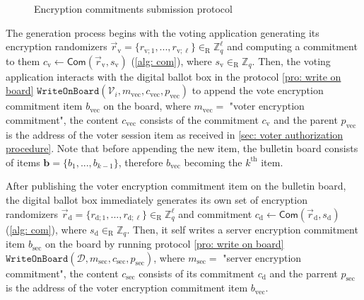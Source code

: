 \begin{figure}[ht]
    \caption{Encryption commitments submission protocol}
    \label{fig: encryption commitments submission protocol}
\end{figure}

The generation process begins with the voting application generating its encryption randomizers $\vec{r}_\mathrm{v} = \{ r_{\mathrm{v}; 1}, ..., r_{\mathrm{v}; \ell} \} \in_\mathrm{R} \mathbb{Z}^\ell_q$ and computing a commitment to them $c_\mathrm{v} \gets \mathsf{Com}(\vec{r}_\mathrm{v}, s_\mathrm{v})$ (\cref{alg: com}), where $s_\mathrm{v} \in_\mathrm{R} \mathbb{Z}_q$. Then, the voting application interacts with the digital ballot box in the protocol \ref{pro: write on board} $\mathtt{WriteOnBoard}(\mathcal{V}_i, m_\mathrm{vec}, c_\mathrm{vec}, p_\mathrm{vec})$ to append the vote encryption commitment item $b_\mathrm{vec}$ on the board, where $m_\mathrm{vec} =$ "voter encryption commitment", the content $c_\mathrm{vec}$ consists of the commitment $c_\mathrm{v}$ and the parent $p_\mathrm{vec}$ is the address of the voter session item as received in \cref{sec: voter authorization procedure}. Note that before appending the new item, the bulletin board consists of items $\boldsymbol{b} = \{ b_1, ..., b_{k-1} \}$, therefore $b_\mathrm{vec}$ becoming the $k^\mathrm{th}$ item.

After publishing the voter encryption commitment item on the bulletin board, the digital ballot box immediately generates its own set of encryption randomizers $\vec{r}_\mathrm{d} = \{ r_{\mathrm{d}; 1}, ..., r_{\mathrm{d}; \ell} \} \in_\mathrm{R} \mathbb{Z}^\ell_q$ and commitment $c_\mathrm{d} \gets \mathsf{Com}(\vec{r}_\mathrm{d}, s_\mathrm{d})$ (\cref{alg: com}), where $s_\mathrm{d} \in_\mathrm{R} \mathbb{Z}_q$. Then, it self writes a server encryption commitment item $b_\mathrm{sec}$ on the board by running protocol \ref{pro: write on board} $\mathtt{WriteOnBoard}(\mathcal{D}, m_\mathrm{sec}, c_\mathrm{sec}, p_\mathrm{sec})$, where $m_\mathrm{sec} =$ "server encryption commitment", the content $c_\mathrm{sec}$ consists of its commitment $c_\mathrm{d}$ and the parrent $p_\mathrm{sec}$ is the address of the voter encryption commitment item $b_\mathrm{vec}$.

